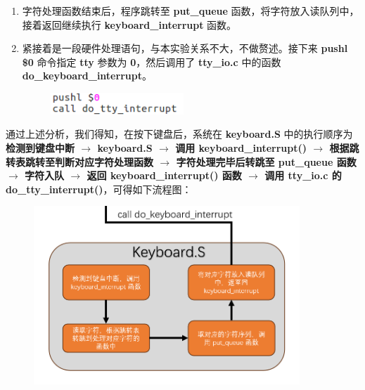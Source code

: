 \begin{enumerate}
\begin{itemize}
\begin{figure}[htbp]
                            \end{figure}
                    \end{itemize}
                \item 字符处理函数结束后，程序跳转至 \textbf{put\_queue} 函数，将字符放入读队列中，接着返回继续执行 \textbf{keyboard\_interrupt} 函数。
                \newpage
                \item 紧接着是一段硬件处理语句，与本实验关系不大，不做赘述。接下来 \textbf{pushl \$0} 命令指定 \textbf{tty} 参数为 \textbf{0}，然后调用了 \textbf{tty\_io.c} 中的函数 \textbf{do\_keyboard\_interrupt}。
                \begin{figure}[htbp]
                    \hspace*{2.3cm}
                    \includegraphics*[width = 5cm]{s0_5.png}   
                \end{figure}
            \end{enumerate}
            \par 通过上述分析，我们得知，在按下键盘后，系统在 \textbf{keyboard.S} 中的执行顺序为 \textbf{检测到键盘中断 $\rightarrow$ keyboard.S $\rightarrow$ 调用 keyboard\_interrupt() $\rightarrow$ 根据跳转表跳转至判断对应字符处理函数 $\rightarrow$ 字符处理完毕后转跳至 put\_queue 函数 $\rightarrow$ 字符入队 $\rightarrow$ 返回 keyboard\_interrupt() 函数 $\rightarrow$ 调用 tty\_io.c 的 do\_tty\_interrupt()}，可得如下流程图：
            \begin{figure}[htbp]
                \centering
                \includegraphics*[width = 10cm]{s0_6.png}
            \end{figure}
